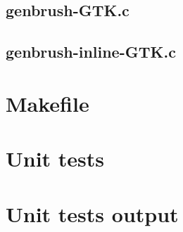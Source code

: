 \subsection{genbrush-GTK.c}

\begin{scriptsize}
\begin{ttfamily}

\end{ttfamily}
\end{scriptsize}

\subsection{genbrush-inline-GTK.c}

\begin{scriptsize}
\begin{ttfamily}

\end{ttfamily}
\end{scriptsize}

\section{Makefile}

\begin{scriptsize}
\begin{ttfamily}

\end{ttfamily}
\end{scriptsize}

\section{Unit tests}

\begin{scriptsize}
\begin{ttfamily}

\end{ttfamily}
\end{scriptsize}

\section{Unit tests output}

\begin{scriptsize}
\begin{ttfamily}

\end{ttfamily}
\end{scriptsize}

